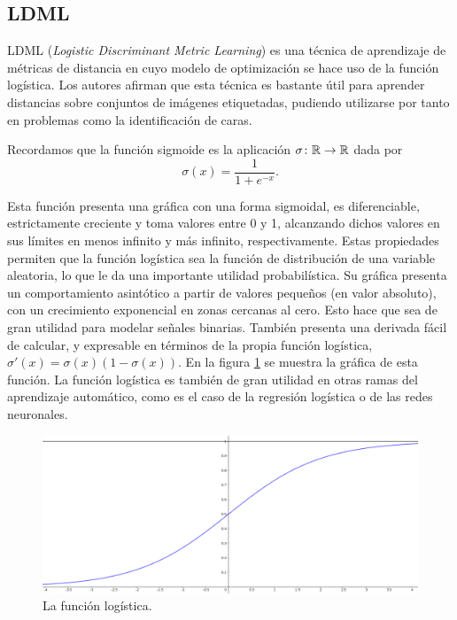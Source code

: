 



\subsection{LDML}

LDML (\emph{Logistic Discriminant Metric Learning}) \cite{ldml} es una técnica de aprendizaje de métricas de distancia en cuyo modelo de optimización se hace uso de la función logística. Los autores afirman que esta técnica es bastante útil para aprender distancias sobre conjuntos de imágenes etiquetadas, pudiendo utilizarse por tanto en problemas como la identificación de caras.

Recordamos que la función sigmoide es la aplicación $\sigma\colon \mathbb{R} \to \mathbb{R}$ dada por
\[ \sigma(x) = \frac{1}{1+e^{-x}}. \]

Esta función presenta una gráfica con una forma sigmoidal, es diferenciable, estrictamente creciente y toma valores entre 0 y 1, alcanzando dichos valores en sus límites en menos infinito y más infinito, respectivamente. Estas propiedades permiten que la función logística sea la función de distribución de una variable aleatoria, lo que le da una importante utilidad probabilística. Su gráfica presenta  un comportamiento asintótico a partir de valores pequeños (en valor absoluto), con un crecimiento exponencial en zonas cercanas al cero. Esto hace que sea de gran utilidad para modelar señales binarias. También presenta una derivada fácil de calcular, y expresable en términos de la propia función logística, $\sigma'(x) = \sigma(x)(1-\sigma(x))$. En la figura \ref{fig:funcion_logistica} se muestra la gráfica de esta función. La función logística es también de gran utilidad en otras ramas del aprendizaje automático, como es el caso de la regresión logística o de las redes neuronales.

\begin{figure}[h]
    \centering
    \includegraphics[width=1.0\textwidth]{images/logistica.png}
    \caption{La función logística.} \label{fig:funcion_logistica}
\end{figure}

